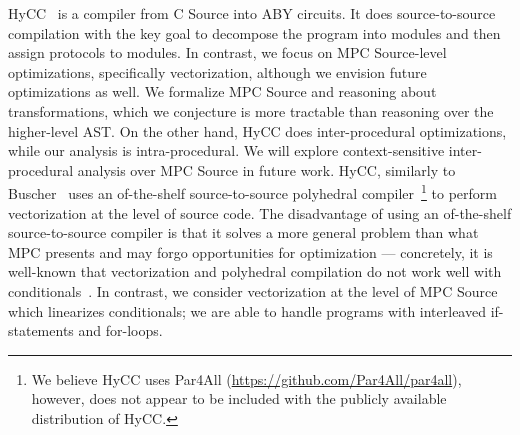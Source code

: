 
HyCC~\cite{CCS:BDKKS18} is a compiler from C Source into ABY circuits. It does source-to-source compilation with the key goal to decompose the 
program into modules and then assign protocols to modules. In contrast, we focus on MPC Source-level optimizations, specifically vectorization, although we envision 
future optimizations as well. We formalize MPC Source and reasoning about transformations, which we conjecture is more tractable than reasoning over
the higher-level AST. On the other hand, HyCC does inter-procedural optimizations, while our analysis is intra-procedural. We will explore context-sensitive inter-procedural 
analysis over MPC Source in future work. HyCC, similarly to Buscher~\cite{Buscher:2018} uses an of-the-shelf source-to-source polyhedral compiler~\footnote{We believe HyCC uses 
Par4All (\url{https://github.com/Par4All/par4all}), however, does not appear to be included with the publicly available distribution of HyCC.}
to perform vectorization at the level of source code. The disadvantage of using an of-the-shelf source-to-source compiler is that it solves a more general 
problem than what MPC presents and may forgo opportunities for optimization --- concretely, it is well-known that vectorization and polyhedral compilation 
do not work well with conditionals~\cite{Benabderrahmane:2010,Karrenberg:2015}. In contrast, we consider vectorization at the level of MPC Source which 
linearizes conditionals; we are able to handle programs with interleaved if-statements and for-loops. %
 

\squeeze
